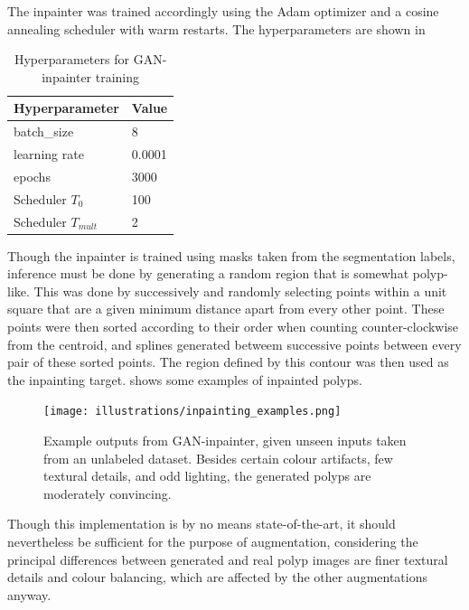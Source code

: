 The inpainter was trained accordingly using the Adam optimizer and a cosine annealing scheduler with warm restarts. The hyperparameters are shown in 
\begin{table}[h!]
    \centering
\begin{tabularx}{\linewidth}{@{}XX@{}}
    \toprule
     Hyperparameter & Value \\
     \midrule
     batch\_size & 8 \\
     learning rate & 0.0001 \\
     epochs & 3000 \\
     Scheduler \(T_0\) & 100\\
     Scheduler \(T_{mult}\) & 2 \\
     \bottomrule
\end{tabularx}
    \caption{Hyperparameters for GAN-inpainter training}
    \label{tab:inpainting_hyperparameters}
\end{table}

Though the inpainter is trained using masks taken from the segmentation labels, inference must be done by generating a random region that is somewhat polyp-like. This was done by successively and randomly selecting points within a unit square that are a given minimum distance apart from every other point. These points were then sorted according to their order when counting counter-clockwise from the centroid, and splines generated betweem successive points between every pair of these sorted points. The region defined by this contour was then used as the inpainting target.  shows some examples of inpainted polyps. 

\begin{figure}
    \centering
    \texttt{[image: illustrations/inpainting\_examples.png]} 
    \caption[GAN-inpainter rexamples]{Example outputs from GAN-inpainter, given unseen inputs taken from an unlabeled dataset. Besides certain colour artifacts, few textural details, and odd lighting, the generated polyps are moderately convincing.}
    \label{fig:inpaint}
\end{figure}


Though this implementation is by no means state-of-the-art, it should nevertheless be sufficient for the purpose of augmentation, considering the principal differences between generated and real polyp images are finer textural details and colour balancing, which are affected by the other augmentations anyway. 

